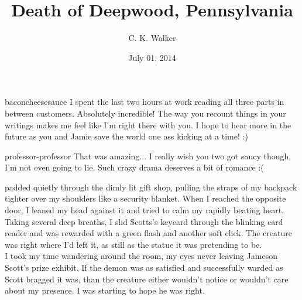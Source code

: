 \documentclass[a5paper]{scrartcl}
\title{Death of Deepwood, Pennsylvania}
\author{C. K. Walker}
\date{July 01, 2014}
\begin{document}
\maketitle

\begin{shadequote}[l]{baconcheesesauce}
I spent the last two hours at work reading all three parts in between customers. Absolutely incredible! The way you recount things in your writings makes me feel like I'm right there with you. I hope to hear more in the future as you and Jamie save the world one ass kicking at a time! :)
\end{shadequote}

\begin{shadequote}[l]{professor-professor}
That was amazing... I really wish you two got saucy though, I'm not even going to lie. Such crazy drama deserves a bit of romance :(
\end{shadequote}


\clearpage

 padded quietly through the dimly lit gift shop, pulling the straps of my backpack tighter over my shoulders like a security blanket. When I reached the opposite door, I leaned my head against it and tried to calm my rapidly beating heart. \\


Taking several deep breaths, I slid Scotts's keycard through the blinking card reader and was rewarded with a green flash and another soft click. The creature was right where I'd left it, as still as the statue it was pretending to be. \\


I took my time wandering around the room, my eyes never leaving Jameson Scott's prize exhibit. If the demon was as satisfied and successfully warded as Scott bragged it was, than the creature either wouldn't notice or wouldn't care about my presence.  I was starting to hope he was right. \\
\end{document}
